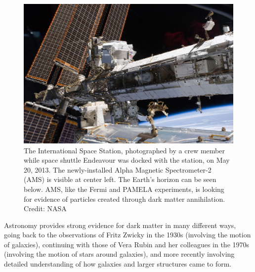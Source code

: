 \documentclass[12pt]{iopart}
\begin{document}
\begin{figure}[htbp]
\centering
 \includegraphics[bb=0 0 360 250, width=5in]{Fig11-AMS-02.eps}
 \caption{The International Space Station, photographed by a crew member while space shuttle Endeavour was docked with the station, on May 20, 2013. The newly-installed Alpha Magnetic Spectrometer-2 (AMS) is visible at center left. The Earth's horizon can be seen below. AMS, like the Fermi and PAMELA experiments, is looking for evidence of particles created through dark matter annihilation. Credit: NASA \label{Fig11-AMS-02.eps}}
\end{figure}

Astronomy provides strong evidence for dark matter in many different ways, going back to the observations of Fritz Zwicky in the 1930s (involving the motion of galaxies), continuing with those of Vera Rubin and her colleagues in the 1970s (involving the motion of stars around galaxies), and more recently involving detailed understanding of how galaxies and larger structures came to form. 
\end{document}
